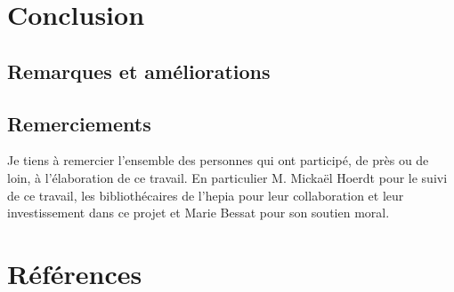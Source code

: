 \documentclass[a4paper, 12pt]{article}
\begin{document}
\section{Conclusion}
\subsection{Remarques et améliorations}
\subsection{Remerciements}
Je tiens à remercier l'ensemble des personnes qui ont participé, de près ou de loin, à l'élaboration de ce travail. En 
particulier M. Mickaël Hoerdt pour le suivi de ce travail, les bibliothécaires de l'hepia pour leur collaboration et 
leur investissement dans ce projet et Marie Bessat pour son soutien moral.

\section{Références}


\end{document}
